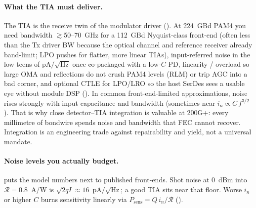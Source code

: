 \paragraph{What the TIA must deliver.}
\label{sec:tia-specs}

The TIA is the receive twin of the modulator driver (). At
224~GBd PAM4 you need bandwidth $\gtrsim$50--70~GHz for a 112~GBd Nyquist-class
front-end (often less than the Tx driver BW because the optical channel and
reference receiver already band-limit; LPO pushes for flatter, more linear TIAs),
input-referred noise in the low teens of pA$/\sqrt{\mathrm{Hz}}$ once co-packaged
with a low-$C$ PD, linearity / overload so large OMA and reflections do not crush
PAM4 levels (RLM) or trip AGC into a bad corner, and optional CTLE for LPO/LRO so
the host SerDes sees a usable eye without module DSP
().
In common front-end-limited approximations, noise rises strongly with input
capacitance and bandwidth (sometimes near $i_n \propto C\,f^{3/2}$). That is why
close detector--TIA integration is valuable at 200G+: every millimetre of
bondwire spends noise and bandwidth that FEC cannot recover. Integration is an
engineering trade against repairability and yield, not a universal mandate.

\paragraph{Noise levels you actually budget.}
 puts the model numbers next to published front-ends. Shot noise
at 0~dBm into $\mathcal{R}=0.8$~A/W is $\sqrt{2qI}\approx16$~pA$/\sqrt{\mathrm{Hz}}$;
a good TIA sits near that floor. Worse $i_n$ or higher $C$ burns sensitivity
linearly via $P_{\mathrm{sens}}=Q\,i_n/\mathcal{R}$ ().

